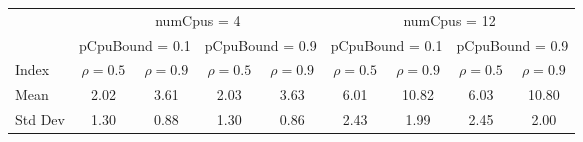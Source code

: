 \begin{tabular}{lc|c|c|c|c|c|c|c}
\toprule
& \multicolumn{4}{c|}{numCpus = 4} & \multicolumn{4}{c}{numCpus = 12} \\
& \multicolumn{2}{c|}{pCpuBound = 0.1} & \multicolumn{2}{c|}{pCpuBound = 0.9} & \multicolumn{2}{c|}{pCpuBound = 0.1} & \multicolumn{2}{c}{pCpuBound = 0.9} \\
Index & $\rho = 0.5$ & $\rho = 0.9$ & $\rho = 0.5$ & $\rho = 0.9$ & $\rho = 0.5$ & $\rho = 0.9$ & $\rho = 0.5$ & $\rho = 0.9$ \\
\midrule
Mean & 2.02 & 3.61 & 2.03 & 3.63 & 6.01 & 10.82 & 6.03 & 10.80 \\
\midrule
Std Dev & 1.30 & 0.88 & 1.30 & 0.86 & 2.43 & 1.99 & 2.45 & 2.00 \\
\bottomrule
\end{tabular}